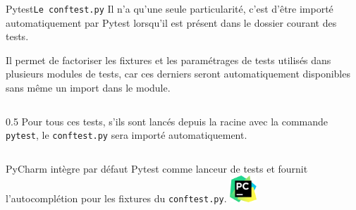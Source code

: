 \documentclass{beamer}
\begin{document}
    \begin{frame}{Pytest}{\lstinline{Le conftest.py}}
        \transdissolve
        Il n'a qu'une seule particularité, c'est d'être importé automatiquement par Pytest lorsqu'il est présent dans le dossier courant des tests.

        Il permet de factoriser les fixtures et les paramétrages de tests utilisés dans plusieurs modules de tests, car ces derniers seront automatiquement disponibles sans même un import dans le module.
        \begin{columns}
            \column
            {0.5\textwidth}
            Pour tous ces tests, s'ils sont lancés depuis la racine avec la commande \lstinline{pytest}, le \lstinline{conftest.py} sera importé automatiquement.
        \end{columns}
        \bigbreak
        \begin{columns}
            PyCharm intègre par défaut Pytest comme lanceur de tests et fournit l'autocomplétion pour les fixtures du \lstinline{conftest.py}.
            \centering
            \includegraphics[width=1cm]{image/logo-pycharm}
        \end{columns}
    \end{frame}
\end{document}
